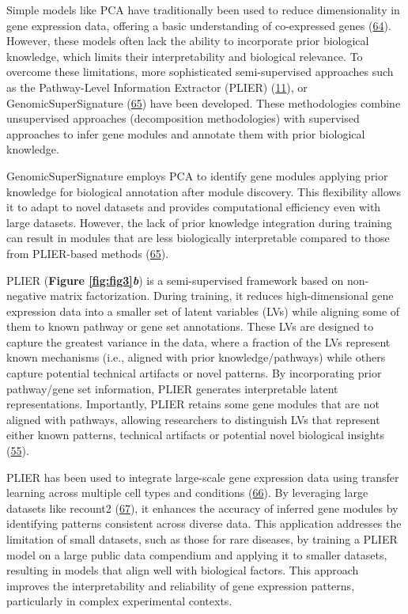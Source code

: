 Simple models like PCA have traditionally been used to reduce dimensionality in gene expression data, offering a basic understanding of co-expressed genes (\protect\hyperlink{ref-1703M7bru}{64}).
However, these models often lack the ability to incorporate prior biological knowledge, which limits their interpretability and biological relevance.
To overcome these limitations, more sophisticated semi-supervised approaches such as the Pathway-Level Information Extractor (PLIER) (\protect\hyperlink{ref-Ki2ij7zE}{11}), or GenomicSuperSignature (\protect\hyperlink{ref-X4fhSCkz}{65}) have been developed.
These methodologies combine unsupervised approaches (decomposition methodologies) with supervised approaches to infer gene modules and annotate them with prior biological knowledge.

GenomicSuperSignature employs PCA to identify gene modules applying prior knowledge for biological annotation after module discovery.
This flexibility allows it to adapt to novel datasets and provides computational efficiency even with large datasets.
However, the lack of prior knowledge integration during training can result in modules that are less biologically interpretable compared to those from PLIER-based methods (\protect\hyperlink{ref-X4fhSCkz}{65}).

PLIER (\textbf{Figure \ref{fig:fig3}\emph{b}}) is a semi-supervised framework based on non-negative matrix factorization.
During training, it reduces high-dimensional gene expression data into a smaller set of latent variables (LVs) while aligning some of them to known pathway or gene set annotations.
These LVs are designed to capture the greatest variance in the data, where a fraction of the LVs represent known mechanisms (i.e., aligned with prior knowledge/pathways) while others capture potential technical artifacts or novel patterns.
By incorporating prior pathway/gene set information, PLIER generates interpretable latent representations.
Importantly, PLIER retains some gene modules that are not aligned with pathways, allowing researchers to distinguish LVs that represent either known patterns, technical artifacts or potential novel biological insights (\protect\hyperlink{ref-dg9nKuy0}{55}).

PLIER has been used to integrate large-scale gene expression data using transfer learning across multiple cell types and conditions (\protect\hyperlink{ref-14rnBunuZ}{66}).
By leveraging large datasets like recount2 (\protect\hyperlink{ref-6SPTvFXq}{67}), it enhances the accuracy of inferred gene modules by identifying patterns consistent across diverse data.
This application addresses the limitation of small datasets, such as those for rare diseases, by training a PLIER model on a large public data compendium and applying it to smaller datasets, resulting in models that align well with biological factors.
This approach improves the interpretability and reliability of gene expression patterns, particularly in complex experimental contexts.

